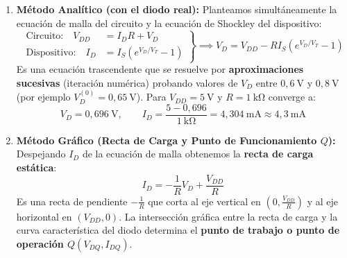 \begin{enumerate}[leftmargin=*]
    \item \textbf{Método Analítico (con el diodo real):}
    Planteamos simultáneamente la ecuación de malla del circuito y la ecuación de Shockley del dispositivo:
    \begin{equation}
        \left. \begin{aligned}
            \text{Circuito:} \quad V_{DD} &= I_D R + V_D \\
            \text{Dispositivo:} \quad I_D &= I_S \left(e^{V_D / V_T} - 1\right)
        \end{aligned} \right\} \implies V_D = V_{DD} - R I_S \left(e^{V_D / V_T} - 1\right)
    \end{equation}
    Es una ecuación trascendente que se resuelve por \textbf{aproximaciones sucesivas} (iteración numérica) probando valores de $V_D$ entre $0{,}6\ \si{\volt}$ y $0{,}8\ \si{\volt}$ (por ejemplo $V_D^{(0)} = 0{,}65\ \si{\volt}$). Para $V_{DD} = 5\ \si{\volt}$ y $R = 1\ \si{\kilo\ohm}$ converge a:
    \begin{equation}
        V_D = 0{,}696\ \si{\volt}, \qquad I_D = \frac{5 - 0{,}696}{1\ \si{\kilo\ohm}} = 4{,}304\ \si{\milli\ampere} \approx 4{,}3\ \si{\milli\ampere}
    \end{equation}

    \item \textbf{Método Gráfico (Recta de Carga y Punto de Funcionamiento $Q$):}
    Despejando $I_D$ de la ecuación de malla obtenemos la \textbf{recta de carga estática}:
    \begin{equation}
        I_D = -\frac{1}{R} V_D + \frac{V_{DD}}{R}
    \end{equation}
    Es una recta de pendiente $-\frac{1}{R}$ que corta al eje vertical en $\left(0, \frac{V_{DD}}{R}\right)$ y al eje horizontal en $(V_{DD}, 0)$. La intersección gráfica entre la recta de carga y la curva característica del diodo determina el \textbf{punto de trabajo o punto de operación $Q(V_{DQ}, I_{DQ})$}.


\end{enumerate}
